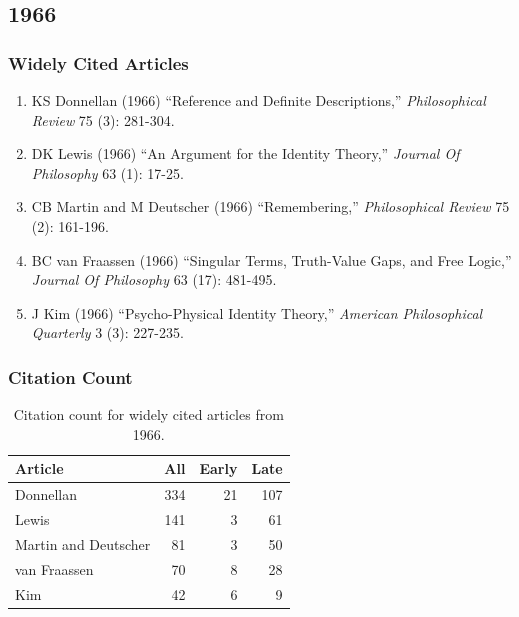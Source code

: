 \documentclass[
  10pt,
  letterpaper,
  DIV=11,
  numbers=noendperiod,
  twoside]{scrartcl}
\providecommand{\tightlist}{%
  \setlength{\itemsep}{0pt}\setlength{\parskip}{0pt}}\usepackage{longtable,booktabs,array}
\begin{document}
\newpage

\subsection{1966}\label{sec-s1966}

\subsubsection*{Widely Cited Articles}\label{widely-cited-articles-10}

\begin{enumerate}
\def\labelenumi{\arabic{enumi}.}
\tightlist
\item
  KS Donnellan (1966) ``Reference and Definite Descriptions,''
  \emph{Philosophical Review} 75 (3): 281-304.
\item
  DK Lewis (1966) ``An Argument for the Identity Theory,'' \emph{Journal
  Of Philosophy} 63 (1): 17-25.
\item
  CB Martin and M Deutscher (1966) ``Remembering,'' \emph{Philosophical
  Review} 75 (2): 161-196.
\item
  BC van Fraassen (1966) ``Singular Terms, Truth-Value Gaps, and Free
  Logic,'' \emph{Journal Of Philosophy} 63 (17): 481-495.
\item
  J Kim (1966) ``Psycho-Physical Identity Theory,'' \emph{American
  Philosophical Quarterly} 3 (3): 227-235.
\end{enumerate}

\subsubsection*{Citation Count}\label{sec-count-1966}

\begin{longtable}[]{@{}lrrr@{}}

\caption{\label{tbl-citation-count-1966}Citation count for widely cited
articles from 1966.}

\tabularnewline

\toprule\noalign{}
Article & All & Early & Late \\
\midrule\noalign{}
\endhead
\bottomrule\noalign{}
\endlastfoot
Donnellan & 334 & 21 & 107 \\
Lewis & 141 & 3 & 61 \\
Martin and Deutscher & 81 & 3 & 50 \\
van Fraassen & 70 & 8 & 28 \\
Kim & 42 & 6 & 9 \\

\end{longtable}
\end{document}
